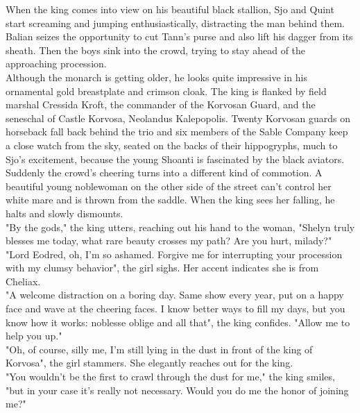 When the king comes into view on his beautiful black stallion, Sjo and Quint start screaming and jumping enthusiastically, distracting the man behind them. Balian seizes the opportunity to cut Tann's purse and also lift his dagger from its sheath. Then the boys sink into the crowd, trying to stay ahead of the approaching procession.\\

Although the monarch is getting older, he looks quite impressive in his ornamental gold breastplate and crimson cloak. The king is flanked by field marshal Cressida Kroft, the commander of the Korvosan Guard, and the seneschal of Castle Korvosa, Neolandus Kalepopolis. Twenty Korvosan guards on horseback fall back behind the trio and six members of the Sable Company keep a close watch from the sky, seated on the backs of their hippogryphs, much to Sjo's excitement, because the young Shoanti is fascinated by the black aviators.\\

Suddenly the crowd's cheering turns into a different kind of commotion. A beautiful young noblewoman on the other side of the street can't control her white mare and is thrown from the saddle. When the king sees her falling, he halts and slowly dismounts.\\

"By the gods," the king utters, reaching out his hand to the woman, "Shelyn truly blesses me today, what rare beauty crosses my path? Are you hurt, milady?"\\

"Lord Eodred, oh, I'm so ashamed. Forgive me for interrupting your procession with my clumsy behavior", the girl sighs. Her accent indicates she is from Cheliax.\\

"A welcome distraction on a boring day. Same show every year, put on a happy face and wave at the cheering faces. I know better ways to fill my days, but you know how it works: noblesse oblige and all that", the king confides. "Allow me to help you up."\\

"Oh, of course, silly me, I'm still lying in the dust in front of the king of Korvosa", the girl stammers. She elegantly reaches out for the king.\\

"You wouldn't be the first to crawl through the dust for me," the king smiles, "but in your case it's really not necessary. Would you do me the honor of joining me?"\\

